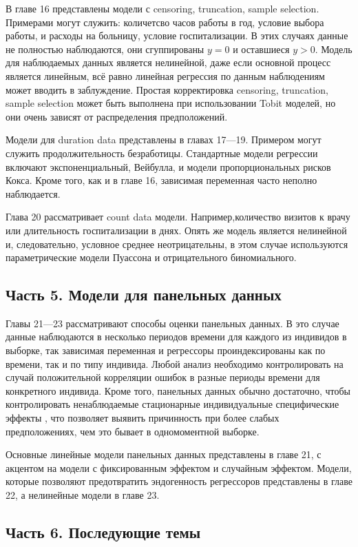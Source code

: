 	
	В главе 16 представлены модели с censoring, truncation, sample selection. Примерами могут служить: количетсво часов работы в год, условие выбора работы, и расходы на больницу, условие госпитализации. В этих случаях данные не полностью наблюдаются, они сгуппированы $y = 0$ и оставшиеся $y > 0$. Модель для наблюдаемых данных является нелинейной, даже если основной процесс является линейным, всё равно линейная регрессия по данным наблюдениям может вводить в заблуждение. Простая корректировка censoring, truncation, sample selection может быть выполнена при использовании Tobit моделей, но они очень зависят от распределения предположений.
	
	
	Модели для duration data представлены в главах 17---19. Примером могут служить продолжительность безработицы. Стандартные модели регрессии включают экспоненциальный, Вейбулла, и модели пропорциональных рисков Кокса. Кроме того, как и в главе 16, зависимая переменная часто неполно наблюдается. 
	
	
	Глава 20 рассматривает  count data модели. Например,количество визитов к врачу или длительность госпитализации в днях. Опять же модель является нелинейной и, следовательно, условное среднее неотрицательны, в этом случае используются параметрические модели Пуассона и отрицательного биномиального.

\subsection{Часть 5. Модели для панельных данных}

Главы 21---23 рассматривают способы оценки панельных данных. В это случае данные наблюдаются в несколько периодов времени для каждого из индивидов в выборке, так зависимая переменная и регрессоры проиндексированы как по времени, так и по типу индивида. Любой анализ необходимо контролировать на случай положительной корреляции ошибок в разные периоды времени для конкретного индивида. Кроме того, панельных данных обычно достаточно, чтобы контролировать ненаблюдаемые стационарные индивидуальные специфические эффекты , что позволяет выявить причинность при более слабых предположениях, чем это бывает в одномоментной выборке.


	Основные линейные модели панельных данных представлены в главе 21, с акцентом на модели с фиксированным эффектом и случайным эффектом. Модели, которые позволяют предотвратить эндогенность регрессоров представлены в главе 22, а  нелинейные модели в главе 23.

\subsection{Часть 6. Последующие темы}

